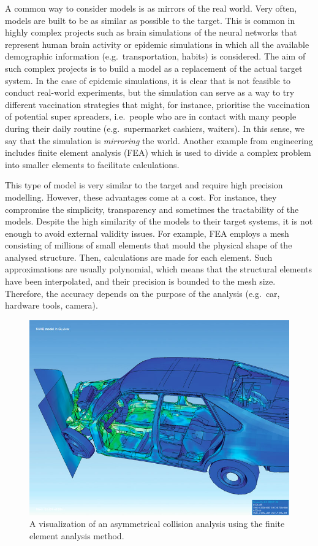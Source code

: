 \documentclass[
]{book}
\begin{document}
A common way to consider models is as mirrors of the real world. Very often, models are built to be as similar as possible to the target. This is common in highly complex projects such as brain simulations of the neural networks that represent human brain activity or epidemic simulations in which all the available demographic information (e.g.~transportation, habits) is considered. The aim of such complex projects is to build a model as a replacement of the actual target system. In the case of epidemic simulations, it is clear that is not feasible to conduct real-world experiments, but the simulation can serve as a way to try different vaccination strategies that might, for instance, prioritise the vaccination of potential super spreaders, i.e.~people who are in contact with many people during their daily routine (e.g.~supermarket cashiers, waiters). In this sense, we say that the simulation is \emph{mirroring} the world. Another example from engineering includes finite element analysis (FEA) which is used to divide a complex problem into smaller elements to facilitate calculations.

This type of model is very similar to the target and require high precision modelling. However, these advantages come at a cost. For instance, they compromise the simplicity, transparency and sometimes the tractability of the models. Despite the high similarity of the models to their target systems, it is not enough to avoid external validity issues. For example, FEA employs a mesh consisting of millions of small elements that mould the physical shape of the analysed structure. Then, calculations are made for each element. Such approximations are usually polynomial, which means that the structural elements have been interpolated, and their precision is bounded to the mesh size. Therefore, the accuracy depends on the purpose of the analysis (e.g.~car, hardware tools, camera).

\begin{figure}

{\centering \includegraphics[width=0.5\linewidth]{Figures/FAE_visualization} 

}

\caption{A visualization of an asymmetrical collision analysis using the finite element analysis method.}\label{fig:fea}
\end{figure}
\end{document}
